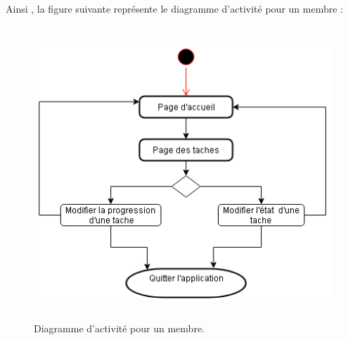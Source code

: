 Ainsi , la figure suivante représente le diagramme d'activit\'{e} pour un membre :
\begin{figure}[H]
\center
\includegraphics[width=13cm,height=11cm]{./figures/activity_m.png}
\caption{Diagramme d'activit\'{e} pour un membre.}

\end{figure}
\FloatBarrier
